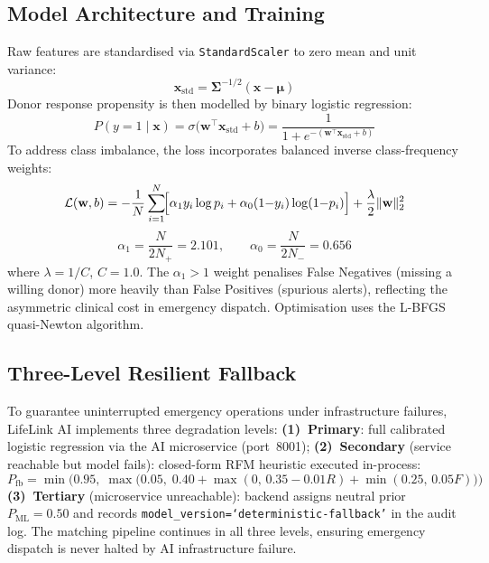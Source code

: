 \documentclass[conference]{IEEEtran}
\begin{document}
\subsection{Model Architecture and Training}
Raw features are standardised via \texttt{StandardScaler} to zero mean
and unit variance:
\begin{equation}
  \mathbf{x}_\mathrm{std} = \boldsymbol{\Sigma}^{-1/2}(\mathbf{x}-\boldsymbol{\mu})
\end{equation}
Donor response propensity is then modelled by binary logistic regression:
\begin{equation}
  P(y{=}1\mid\mathbf{x})
    = \sigma\!\bigl(\mathbf{w}^\top\mathbf{x}_\mathrm{std}+b\bigr)
    = \frac{1}{1+e^{-(\mathbf{w}^\top\mathbf{x}_\mathrm{std}+b)}}
\end{equation}
To address class imbalance, the loss incorporates balanced inverse
class-frequency weights:
\begin{equation}
  \mathcal{L}(\mathbf{w},b)
    = -\frac{1}{N}\sum_{i=1}^{N}\!\Bigl[
        \alpha_1 y_i\log p_i
        + \alpha_0(1{-}y_i)\log(1{-}p_i)
      \Bigr]
      + \frac{\lambda}{2}\|\mathbf{w}\|_2^2
\end{equation}
\begin{equation}
  \alpha_1 = \frac{N}{2N_+} = 2.101,\qquad
  \alpha_0 = \frac{N}{2N_-} = 0.656
\end{equation}
where $\lambda=1/C$, $C=1.0$. The $\alpha_1>1$ weight penalises False
Negatives (missing a willing donor) more heavily than False Positives
(spurious alerts), reflecting the asymmetric clinical cost in emergency
dispatch. Optimisation uses the L-BFGS quasi-Newton algorithm.

\subsection{Three-Level Resilient Fallback}
To guarantee uninterrupted emergency operations under infrastructure
failures, LifeLink AI implements three degradation levels:
\textbf{(1)~Primary}: full calibrated logistic regression via the AI
microservice (port~8001);
\textbf{(2)~Secondary} (service reachable but model fails): closed-form
RFM heuristic executed in-process:
\begin{equation}
  P_\mathrm{fb} = \min\!\bigl(0.95,\;\max\!\bigl(0.05,\;
    0.40 + \max(0,\,0.35{-}0.01R) + \min(0.25,\,0.05F)\bigr)\bigr)
\end{equation}
\textbf{(3)~Tertiary} (microservice unreachable): backend assigns
neutral prior $P_\mathrm{ML}{=}0.50$ and records
\texttt{model\_version=`deterministic-fallback'} in the audit log. The
matching pipeline continues in all three levels, ensuring emergency
dispatch is never halted by AI infrastructure failure.
\end{document}

